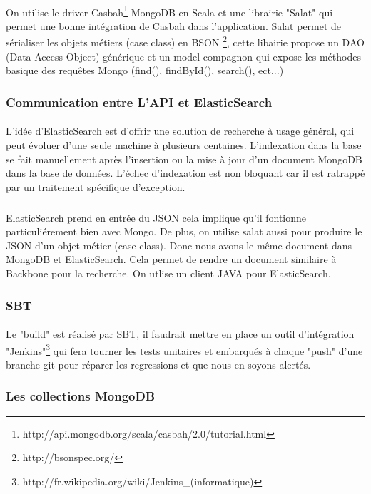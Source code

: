 \paragraph{}
On utilise le driver Casbah\footnote{http://api.mongodb.org/scala/casbah/2.0/tutorial.html} MongoDB en Scala et une librairie "Salat" qui permet une bonne intégration de Casbah dans l'application.
Salat permet de sérialiser les objets métiers (case class) en BSON \footnote{http://bsonspec.org/}, cette libairie propose un DAO (Data Access Object) générique et un model compagnon qui expose les méthodes basique des requêtes Mongo (find(), findById(), search(), ect...)
\subsubsection{Communication entre L'API et ElasticSearch}
\paragraph{}
L’idée d’ElasticSearch est d’offrir une solution de recherche à usage général, qui peut évoluer d’une seule machine à plusieurs centaines.  
L'indexation dans la base se fait manuellement après l'insertion ou la mise à jour d'un document MongoDB dans la base de données.
L'échec d'indexation est non bloquant car il est ratrappé par un traitement spécifique d'exception.
\subparagraph{}
ElasticSearch prend en entrée du JSON cela implique qu'il fontionne particuliérement bien avec Mongo.
De plus, on utilise salat aussi pour produire le JSON d'un objet métier (case class).
Donc nous avons le même document dans MongoDB et ElasticSearch. Cela permet de rendre un document similaire à Backbone pour la recherche.
On utlise un client JAVA pour ElasticSearch.
\subsubsection{SBT}
\paragraph{}
Le "build" est réalisé par SBT, il faudrait mettre en place un outil d'intégration "Jenkins"\footnote{http://fr.wikipedia.org/wiki/Jenkins\_(informatique)} qui fera tourner les tests unitaires et embarqués à chaque "push" d'une branche git pour réparer les regressions et que nous en soyons alertés.
\subsubsection{Les collections MongoDB}
